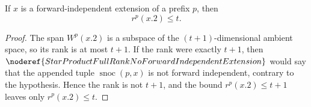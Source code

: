 \begin{lemma}
If \(x\) is a forward-independent extension of a prefix \(p\), then
\[
  r^p(x.2)\le t.
\]
\end{lemma}
\begin{proof}
The span \(W^p(x.2)\) is a subspace of the \((t+1)\)-dimensional ambient
space, so its rank is at most \(t+1\).  If the rank were exactly \(t+1\), then
\(\noderef{StarProductFullRankNoForwardIndependentExtension}\) would say that
the appended tuple \(\operatorname{snoc}(p,x)\) is not forward independent,
contrary to the hypothesis.  Hence the rank is not \(t+1\), and the bound
\(r^p(x.2)\le t+1\) leaves only \(r^p(x.2)\le t\).
\end{proof}
